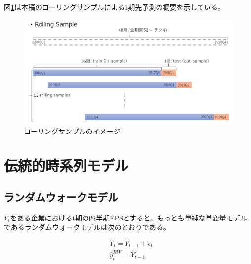 \documentclass[a4paper, 12pt]{jsarticle}
\begin{document}
図\ref{fig:rolling}は本稿のローリングサンプルによる1期先予測の概要を示している。

\begin{figure}
  \centering
  \caption{ローリングサンプルのイメージ}
  \label{fig:rolling}
  \includegraphics[width=12cm]{./img/_rolling_sample.png}
\end{figure}

\section{伝統的時系列モデル}

\subsection{ランダムウォークモデル}

$Y_t$をある企業におけるt期の四半期EPSとすると、もっとも単純な単変量モデルであるランダムウォークモデルは次のとおりである。

\begin{equation}
  \begin{split}
    & Y_t = Y_{t-1} + \epsilon_t \\
    & \hat{y}_t^{RW} = Y_{t-1} \\
  \end{split}
\end{equation}        

\end{document}
